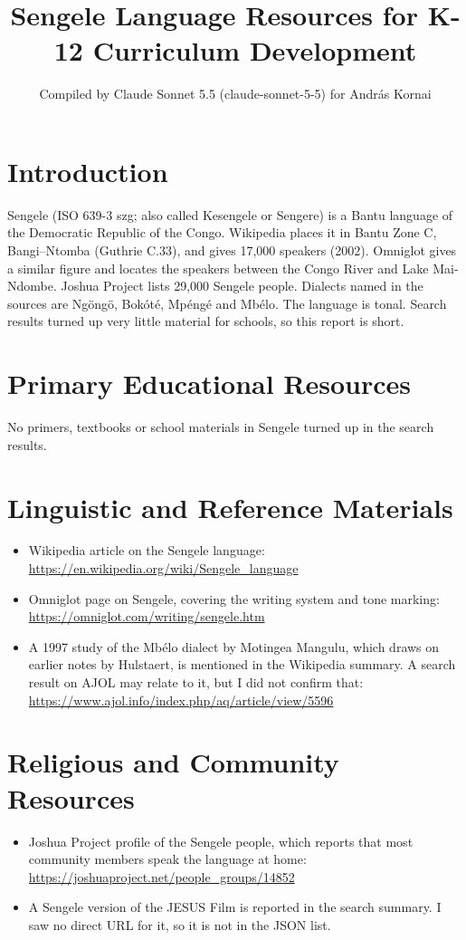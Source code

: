 \documentclass[12pt]{article}
\title{Sengele Language Resources for K-12 Curriculum Development}
\author{Compiled by Claude Sonnet 5.5 (claude-sonnet-5-5) for Andr\'as Kornai}
\date{}
\begin{document}
\maketitle

\section{Introduction}
Sengele (ISO 639-3 szg; also called Kesengele or Sengere) is a Bantu language of the Democratic Republic of the Congo. Wikipedia places it in Bantu Zone C, Bangi--Ntomba (Guthrie C.33), and gives 17,000 speakers (2002). Omniglot gives a similar figure and locates the speakers between the Congo River and Lake Mai-Ndombe. Joshua Project lists 29,000 Sengele people. Dialects named in the sources are Ng\"ong\"o, Bok\'ot\'e, Mp\'eng\'e and Mb\'elo. The language is tonal. Search results turned up very little material for schools, so this report is short.

\section{Primary Educational Resources}
No primers, textbooks or school materials in Sengele turned up in the search results.

\section{Linguistic and Reference Materials}
\begin{itemize}
\item Wikipedia article on the Sengele language: \url{https://en.wikipedia.org/wiki/Sengele_language}
\item Omniglot page on Sengele, covering the writing system and tone marking: \url{https://omniglot.com/writing/sengele.htm}
\item A 1997 study of the Mb\'elo dialect by Motingea Mangulu, which draws on earlier notes by Hulstaert, is mentioned in the Wikipedia summary. A search result on AJOL may relate to it, but I did not confirm that: \url{https://www.ajol.info/index.php/aq/article/view/5596}
\end{itemize}

\section{Religious and Community Resources}
\begin{itemize}
\item Joshua Project profile of the Sengele people, which reports that most community members speak the language at home: \url{https://joshuaproject.net/people_groups/14852}
\item A Sengele version of the JESUS Film is reported in the search summary. I saw no direct URL for it, so it is not in the JSON list.
\end{itemize}
\end{document}
